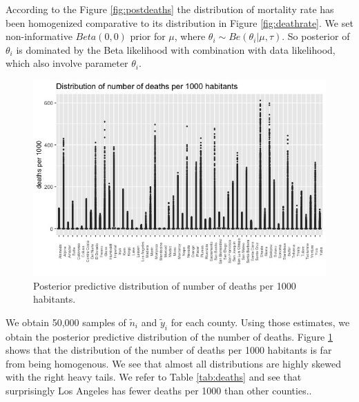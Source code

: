 \documentclass[11pt,twocolumn]{asaproc}
\begin{document}
According to the Figure \ref{fig:postdeaths} the distribution of mortality rate has been homogenized comparative to its distribution in Figure \ref{fig:deathrate}. We set non-informative $Beta(0,0)$ prior for $\mu$, where $\theta_i \sim Be(\theta_i | \mu, \tau)$. So posterior of $\theta_i$ is dominated by the Beta likelihood with combination with data likelihood, which also involve parameter $\theta_i$.


\begin{figure}[t]
\centering\includegraphics[scale=.30]{deaths2.jpeg}
\caption{Posterior predictive distribution of number of deaths per 1000 habitants.}
\label{fig:postdeathss}
\end{figure}

We obtain 50,000 samples of $\tilde{n}_i$ and $\tilde{y}_i$ for each county. Using those estimates, we obtain the posterior predictive distribution of the number of deaths. Figure \ref{fig:postdeathss} shows that the distribution of the number of deaths per 1000 habitants is far from being homogenous. We see that almost all distributions are highly skewed with the right heavy tails. We refer to Table \ref{tab:deaths} and see that surprisingly Los Angeles has fewer deaths per 1000 than other counties..
\end{document}
